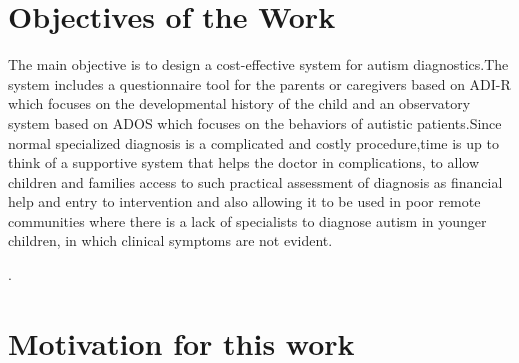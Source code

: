 
\section{Objectives of the Work}
The main objective is to design a cost-effective system for autism diagnostics.The system includes a questionnaire tool for the parents or caregivers based on ADI-R which focuses on the developmental history of the child and an observatory system based on ADOS  which focuses on the behaviors of autistic patients.Since normal specialized diagnosis is a complicated and costly procedure,time is up to think of a supportive system that helps the doctor in complications, to allow children and families access to such practical assessment of diagnosis as ﬁnancial help and  entry to intervention and also allowing it to be used in poor remote communities where there is a lack of specialists to diagnose autism in younger children, in which clinical symptoms are not evident.




.  %




\section{Motivation for this work}

